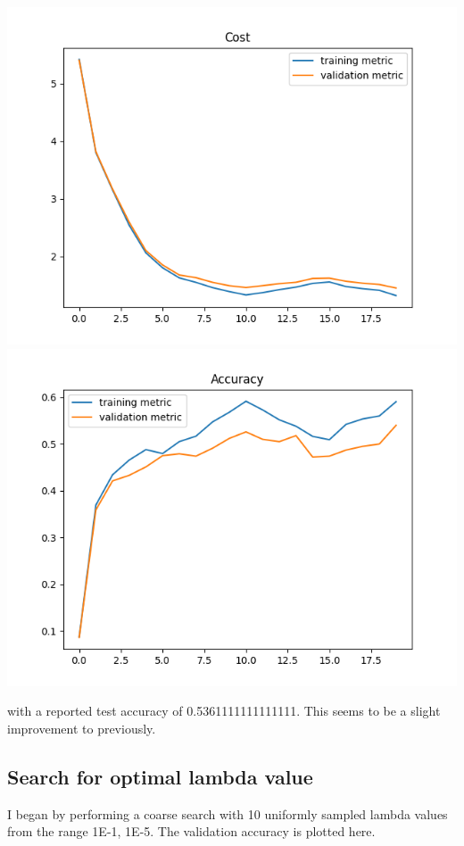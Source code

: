 \documentclass[11pt,a4paper]{article}
\begin{document}
\includegraphics[width=\textwidth]{cost_k=2_batch_norm.png}
\includegraphics[width=\textwidth]{accuracy_k=2_batch_norm.png}

with a reported test accuracy of 0.5361111111111111. This seems to be a slight improvement to previously.

\subsection{Search for optimal lambda value}

I began by performing a coarse search with 10 uniformly sampled lambda values from the range 1E-1, 1E-5. The validation accuracy is plotted here.
\end{document}
